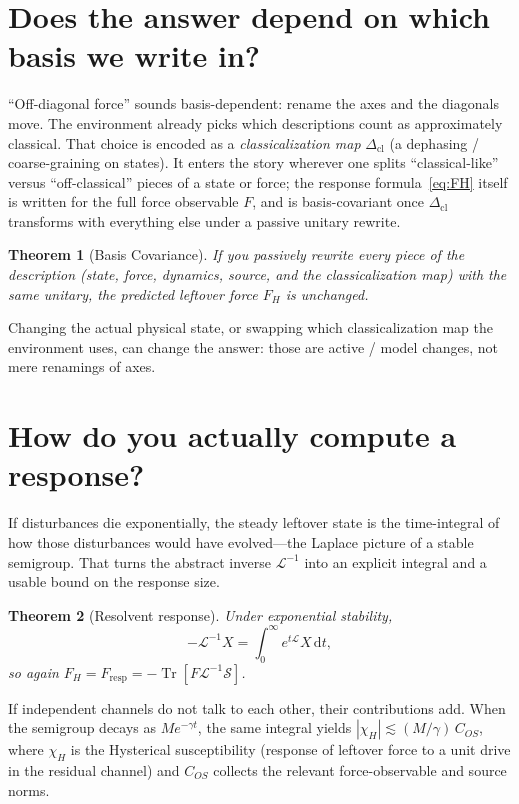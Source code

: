 \documentclass[11pt]{article}
\newtheorem{theorem}{Theorem}[section]
\theoremstyle{remark}
\newcommand{\Tr}{\operatorname{Tr}}
\newcommand{\dd}{\mathrm{d}}
\newcommand{\chiH}{\chi_{H}}
\begin{document}
\section{Does the answer depend on which basis we write in?}
``Off-diagonal force'' sounds basis-dependent: rename the axes and the diagonals move.
The environment already picks which descriptions count as approximately classical.
That choice is encoded as a \emph{classicalization map} $\Delta_{\mathrm{cl}}$ (a dephasing / coarse-graining on states).
It enters the story wherever one splits ``classical-like'' versus ``off-classical'' pieces of a state or force; the response formula~\eqref{eq:FH} itself is written for the full force observable $F$, and is basis-covariant once $\Delta_{\mathrm{cl}}$ transforms with everything else under a passive unitary rewrite.

\begin{theorem}[Basis Covariance]
If you passively rewrite every piece of the description (state, force, dynamics, source, and the classicalization map) with the same unitary, the predicted leftover force $F_H$ is unchanged.
\end{theorem}

Changing the actual physical state, or swapping which classicalization map the environment uses, can change the answer: those are active / model changes, not mere renamings of axes.

\section{How do you actually compute a response?}
If disturbances die exponentially, the steady leftover state is the time-integral of how those disturbances would have evolved---the Laplace picture of a stable semigroup.
That turns the abstract inverse $\mathcal L^{-1}$ into an explicit integral and a usable bound on the response size.

\begin{theorem}[Resolvent response]
Under exponential stability,
\begin{equation}
  -\mathcal L^{-1}X=\int_0^\infty e^{t\mathcal L}X\,\dd t,
\end{equation}
so again $F_H=F_{\mathrm{resp}}=-\Tr[F\mathcal L^{-1}\mathcal S]$.
\end{theorem}

If independent channels do not talk to each other, their contributions add.
When the semigroup decays as $M e^{-\gamma t}$, the same integral yields $|\chiH|\lesssim (M/\gamma)\,C_{OS}$, where $\chiH$ is the Hysterical susceptibility (response of leftover force to a unit drive in the residual channel) and $C_{OS}$ collects the relevant force-observable and source norms.
\end{document}
